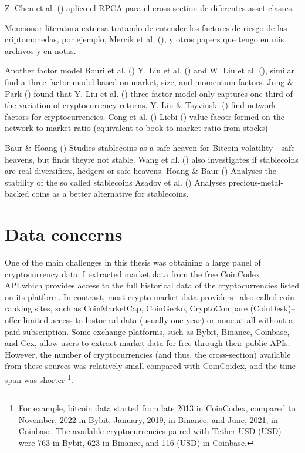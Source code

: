 \documentclass[
  12pt,
  a4paper,
  openany]{scrbook}
\begin{document}
Z. Chen et al. () aplico el RPCA
para el cross-section de diferentes asset-classes.

Mencionar literatura extensa tratando de entender los factores de riesgo
de las criptomonedas, por ejemplo, Mercik et al.
(),
y otros papers que tengo en mis archivos y en notas.

Another factor model Bouri et al.
() Y. Liu et al.
() and W. Liu et al.
(), similar find a three factor
model based on market, size, and momentum factors. Jung \& Park
() found that Y. Liu et al.
() three factor model only
captures one-third of the variation of cryptocurrency returns. Y. Liu \&
Tsyvinski () find network
factors for cryptocurrencies. Cong et al.
() Liebi
() value facotr formed on the
network-to-market ratio (equivalent to book-to-market ratio from stocks)

Baur \& Hoang () Studies
stablecoins as a safe heaven for Bitcoin volatility - safe heavens, but
finds theyre not stable. Wang et al.
() also investigates if
stablecoins are real diversifiers, hedgers or safe heavens. Hoang \&
Baur () Analyses the stability of
the so called stablecoins Asadov et al.
() Analyses
precious-metal-backed coins as a better alternative for stablecoins.

\section{Data concerns}\label{data-concerns}

One of the main challenges in this thesis was obtaining a large panel of
cryptocurrency data. I extracted market data from the free
\href{https://coincodex.com/}{CoinCodex} API,which provides access to
the full historical data of the cryptocurrencies listed on its platform.
In contrast, most crypto market data providers --also called
coin-ranking sites, such as CoinMarketCap, CoinGecko, CryptoCompare
(CoinDesk)-- offer limited access to historical data (usually one year)
or none at all without a paid subscription. Some exchange platforms,
such as Bybit, Binance, Coinbase, and Cex, allow users to extract market
data for free through their public APIs. However, the number of
cryptocurrencies (and thus, the cross-section) available from these
sources was relatively small compared with CoinCoidex, and the time span
was shorter \footnote{For example, bitcoin data started from late 2013
  in CoinCodex, compared to November, 2022 in Bybit, January, 2019, in
  Binance, and June, 2021, in Coinbase. The available cryptocurrencies
  paired with Tether USD (USD) were 763 in Bybit, 623 in Binance, and
  116 (USD) in Coinbase.}.
\end{document}
